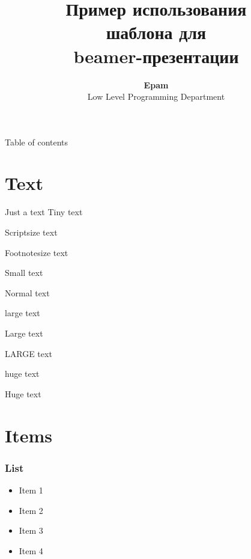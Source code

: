 
\title[bash]{Пример использования\\шаблона для\\beamer-презентации}

\author[Epam]{{\bf Epam}\\Low Level Programming Department}



\begin{frame}
	\titlepage
\end{frame}

\begin{frame}{Table of contents}
	\tableofcontents
\end{frame}


\section{Text}
\begin{frame}{Just a text}
    \tiny Tiny text

    \scriptsize Scriptsize text

    \footnotesize Footnotesize text

    \small Small text

    \normalsize Normal text

    \large large text

    \Large Large text

    \LARGE LARGE text

    \huge huge text

    \Huge Huge text

\end{frame}

\section{Items}
\begin{frame}
    \frametitle{List}

    \begin{itemize}
	\item Item 1
	\item Item 2
	\item Item 3
	\item Item 4
    \end{itemize}
\end{frame}

